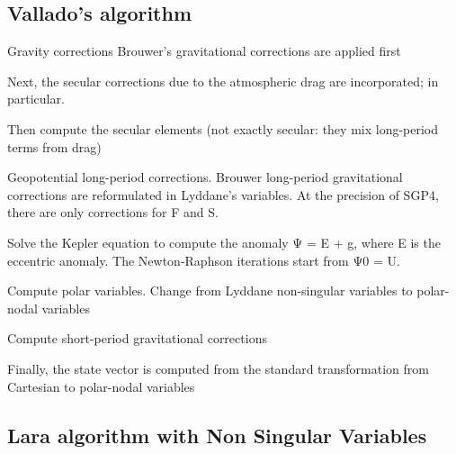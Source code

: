 \documentclass{article}
\begin{document}


\subsection{Vallado's algorithm}
\label{sec:vallado}

Gravity corrections Brouwer’s gravitational corrections are applied first

Next, the secular corrections due to the atmospheric drag are incorporated;
in particular.

Then compute the secular elements (not exactly secular: they mix long-period terms from drag)

Geopotential long-period corrections. Brouwer long-period gravitational corrections are reformulated in Lyddane’s variables.
At the precision of SGP4, there are only corrections for F and S.

Solve the Kepler equation to compute the anomaly Ψ = E + g, where E is the
eccentric anomaly. The Newton-Raphson iterations start from Ψ0 = U.

Compute polar variables. Change from Lyddane non-singular variables to polar-nodal variables

Compute short-period gravitational corrections

Finally, the state vector is computed from the standard transformation from Cartesian to polar-nodal variables

\subsection{Lara algorithm with Non Singular Variables}
\label{sec:lara}
\end{document}
